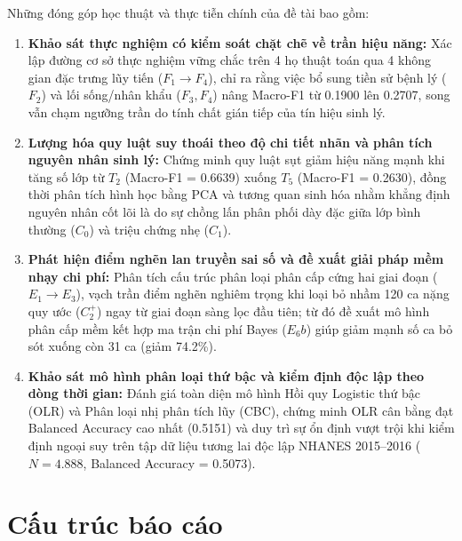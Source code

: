 Những đóng góp học thuật và thực tiễn chính của đề tài bao gồm:
\begin{enumerate}
    \item \textbf{Khảo sát thực nghiệm có kiểm soát chặt chẽ về trần hiệu năng:} Xác lập đường cơ sở thực nghiệm vững chắc trên 4 họ thuật toán qua 4 không gian đặc trưng lũy tiến ($F_1 \to F_4$), chỉ ra rằng việc bổ sung tiền sử bệnh lý ($F_2$) và lối sống/nhân khẩu ($F_3, F_4$) nâng Macro-F1 từ 0.1900 lên 0.2707, song vẫn chạm ngưỡng trần do tính chất gián tiếp của tín hiệu sinh lý.
    \item \textbf{Lượng hóa quy luật suy thoái theo độ chi tiết nhãn và phân tích nguyên nhân sinh lý:} Chứng minh quy luật sụt giảm hiệu năng mạnh khi tăng số lớp từ $T_2$ (Macro-F1 = 0.6639) xuống $T_5$ (Macro-F1 = 0.2630), đồng thời phân tích hình học bằng PCA và tương quan sinh hóa nhằm khẳng định nguyên nhân cốt lõi là do sự chồng lấn phân phối dày đặc giữa lớp bình thường ($C_0$) và triệu chứng nhẹ ($C_1$).
    \item \textbf{Phát hiện điểm nghẽn lan truyền sai số và đề xuất giải pháp mềm nhạy chi phí:} Phân tích cấu trúc phân loại phân cấp cứng hai giai đoạn ($E_1 \to E_3$), vạch trần điểm nghẽn nghiêm trọng khi loại bỏ nhầm 120 ca nặng quy ước ($C_2^+$) ngay từ giai đoạn sàng lọc đầu tiên; từ đó đề xuất mô hình phân cấp mềm kết hợp ma trận chi phí Bayes ($E_6b$) giúp giảm mạnh số ca bỏ sót xuống còn 31 ca (giảm 74.2\%).
    \item \textbf{Khảo sát mô hình phân loại thứ bậc và kiểm định độc lập theo dòng thời gian:} Đánh giá toàn diện mô hình Hồi quy Logistic thứ bậc (OLR) và Phân loại nhị phân tích lũy (CBC), chứng minh OLR cân bằng đạt Balanced Accuracy cao nhất (0.5151) và duy trì sự ổn định vượt trội khi kiểm định ngoại suy trên tập dữ liệu tương lai độc lập NHANES 2015--2016 ($N = 4.888$, Balanced Accuracy = 0.5073).
\end{enumerate}

\section{Cấu trúc báo cáo}
\label{sec:bo-cuc-khoa-luan}

